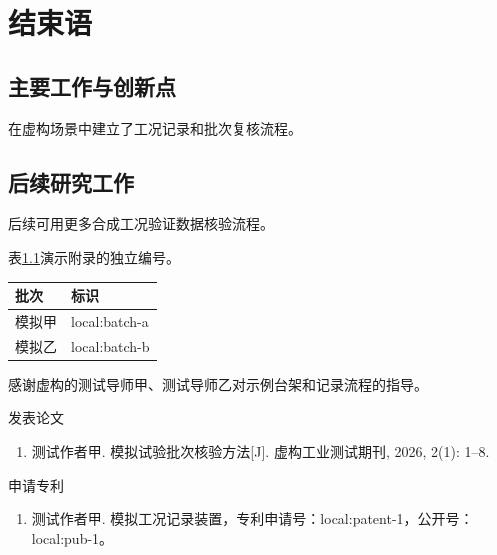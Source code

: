 \documentclass{sdjumthesis}
\begin{document}
\chapter{结束语}
\section{主要工作与创新点}
在虚构场景中建立了工况记录和批次复核流程。
\section{后续研究工作}
后续可用更多合成工况验证数据核验流程。

\printbibliography[heading=none]

\appendix
{}
表\ref{tab:appendix}演示附录的独立编号。
\begin{table}[htbp]
\centering
{}
\label{tab:appendix}
\ThesisTableFont
\begin{tabular}{ll}
\toprule
批次 & 标识\\
\midrule
模拟甲 & local:batch-a\\
模拟乙 & local:batch-b\\
\bottomrule
\end{tabular}
\end{table}

感谢虚构的测试导师甲、测试导师乙对示例台架和记录流程的指导。

\noindent 发表论文
\begin{enumerate}
\renewcommand\labelenumi{[\arabic{enumi}]}
\item 测试作者甲. 模拟试验批次核验方法[J]. 虚构工业测试期刊, 2026, 2(1): 1--8.
\end{enumerate}

\noindent 申请专利
\begin{enumerate}
\renewcommand\labelenumi{[\arabic{enumi}]}
\item 测试作者甲. 模拟工况记录装置，专利申请号：local:patent-1，\allowbreak 公开号：local:pub-1。
\end{enumerate}
\end{document}
